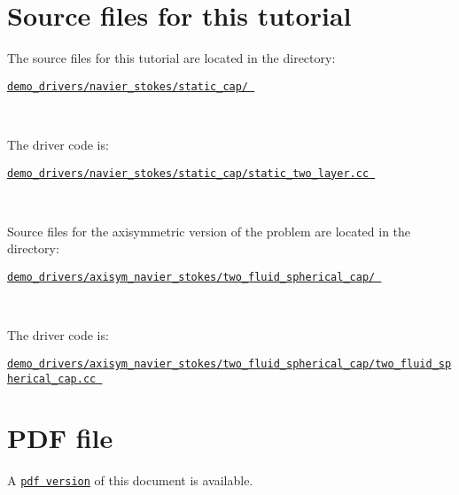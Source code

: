 \hypertarget{index_sources}{}\section{Source files for this tutorial}\label{index_sources}

\begin{DoxyItemize}
\item The source files for this tutorial are located in the directory\+:~\newline
~\newline
\begin{center} \href{../../../../demo_drivers/navier_stokes/static_cap/}{\tt demo\+\_\+drivers/navier\+\_\+stokes/static\+\_\+cap/ } \end{center} ~\newline

\item The driver code is\+: ~\newline
~\newline
\begin{center} \href{../../../../demo_drivers/navier_stokes/static_cap/static_two_layer.cc}{\tt demo\+\_\+drivers/navier\+\_\+stokes/static\+\_\+cap/static\+\_\+two\+\_\+layer.\+cc } \end{center} ~\newline
~\newline

\item Source files for the axisymmetric version of the problem are located in the directory\+:~\newline
~\newline
\begin{center} \href{../../../../demo_drivers/axisym_navier_stokes/two_fluid_spherical_cap/}{\tt demo\+\_\+drivers/axisym\+\_\+navier\+\_\+stokes/two\+\_\+fluid\+\_\+spherical\+\_\+cap/ } \end{center} ~\newline

\item The driver code is\+: ~\newline
~\newline
\begin{center} \href{../../../../demo_drivers/axisym_navier_stokes/two_fluid_spherical_cap/two_fluid_spherical_cap.cc}{\tt demo\+\_\+drivers/axisym\+\_\+navier\+\_\+stokes/two\+\_\+fluid\+\_\+spherical\+\_\+cap/two\+\_\+fluid\+\_\+spherical\+\_\+cap.\+cc } \end{center} 
\end{DoxyItemize}

 

 \hypertarget{index_pdf}{}\section{P\+D\+F file}\label{index_pdf}
A \href{../latex/refman.pdf}{\tt pdf version} of this document is available. 
